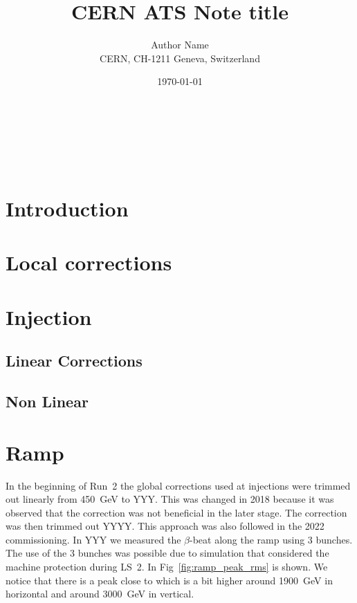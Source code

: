 \documentclass{cernatsnote}
\title{CERN ATS Note title}
\author{
	Author Name \; \\		
	CERN, CH-1211 Geneva, Switzerland
}
\date{\today}
\begin{document}
\maketitle

\begin{abstract}

\end{abstract}
\\ \\ \\ 

\begingroup
\color{black}
\tableofcontents
\endgroup

\pagebreak

\section{Introduction}

\section{Local corrections}
\section{Injection}
\subsection{Linear Corrections}
\subsection{Non Linear}
\section{Ramp}
In the beginning of Run~2 the global corrections used at injections were trimmed out linearly from 450~GeV to YYY. This was changed in 2018 because it was observed that the correction was not beneficial in the later stage. The correction was then trimmed out YYYY. This approach was also followed in the 2022 commissioning. In YYY we measured the $\beta$-beat along the ramp using 3 bunches. The use of the 3 bunches was possible due to simulation that considered the machine protection during LS~2\cite{}. In Fig~\ref{fig:ramp_peak_rms} is shown. We notice that there is a peak close to which is a bit higher around 1900~GeV in horizontal and around 3000~GeV in vertical. 
\end{document}
